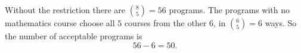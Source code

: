 Without the restriction there are $\binom85=56$ programs. The programs with no mathematics course choose all $5$ courses from the other $6$, in $\binom65=6$ ways. So the number of acceptable programs is
\[
56-6=\boxed{50}.
\]
